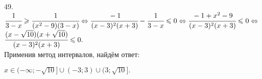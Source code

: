 49. $\cfrac{1}{3-x}\geqslant\cfrac{1}{(x^2-9)(3-x)}\Leftrightarrow\cfrac{-1}{(x-3)^2(x+3)}-\cfrac{1}{3-x}\leqslant0\Leftrightarrow
\cfrac{-1+x^2-9}{(x-3)^2(x+3)}\leqslant0\Leftrightarrow$\\$\cfrac{(x-\sqrt{10})(x+\sqrt{10})}{(x-3)^2(x+3)}\leqslant0.$\\ Применив метод интервалов, найдём ответ:
\begin{figure}[ht!]
\end{figure}
$x\in(-\infty;-\sqrt{10}]\cup(-3;3)\cup(3;\sqrt{10}].$\\
